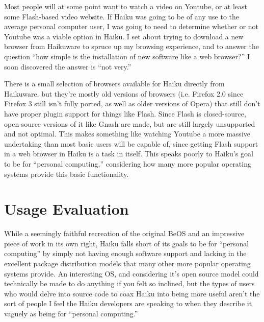 \documentclass{article}
\begin{document}
Most people will at some point want to watch a video on Youtube, or at
least some Flash-based video website.  If Haiku was going to be of any
use to the average personal computer user, I was going to need to
determine whether or not Youtube was a viable option in Haiku.  I set
about trying to download a new browser from Haikuware to spruce up my
browsing experience, and to answer the question ``how simple is the
installation of new software like a web browser?''  I soon discovered
the answer is ``not very.''

There is a small selection of browsers available for Haiku directly
from Haikuware, but they’re mostly old versions of browsers
(i.e. Firefox 2.0 since Firefox 3 still isn’t fully ported, as well as
older versions of Opera) that still don’t have proper plugin support
for things like Flash.  Since Flash is closed-source, open-source
versions of it like Gnash are made, but are still largely unsupported
and not optimal.  This makes something like watching Youtube a more
massive undertaking than most basic users will be capable of, since
getting Flash support in a web browser in Haiku is a task in itself.
This speaks poorly to Haiku’s goal to be for ``personal computing,''
considering how many more popular operating systems provide this basic
functionality.

\section{Usage Evaluation}

While a seemingly faithful recreation of the original BeOS and an
impressive piece of work in its own right, Haiku falls short of its
goals to be for ``personal computing'' by simply not having enough
software support and lacking in the excellent package distribution
models that many other more popular operating systems provide.  An
interesting OS, and considering it’s open source model could
technically be made to do anything if you felt so inclined, but the
types of users who would delve into source code to coax Haiku into
being more useful aren’t the sort of people I feel the Haiku
developers are speaking to when they describe it vaguely as being for
``personal computing.''

{}

\end{document}
